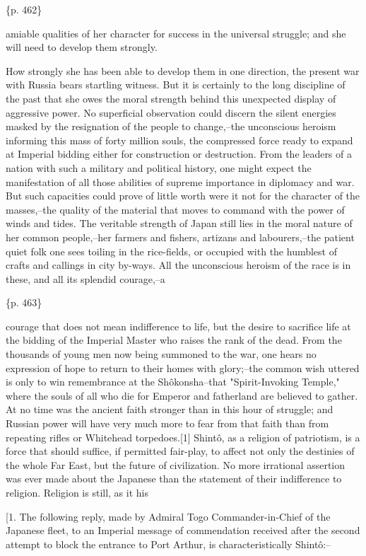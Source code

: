 \{p. 462\}

amiable qualities of her character for success in the universal struggle; and she will need to develop them strongly.


How strongly she has been able to develop them in one direction, the present war with Russia bears startling witness. But it is certainly to the long discipline of the past that she owes the moral strength behind this unexpected display of aggressive power. No superficial observation could discern the silent energies masked by the resignation of the people to change,--the unconscious heroism informing this mass of forty million souls, the compressed force ready to expand at Imperial bidding either for construction or destruction. From the leaders of a nation with such a military and political history, one might expect the manifestation of all those abilities of supreme importance in diplomacy and war. But such capacities could prove of little worth were it not for the character of the masses,--the quality of the material that moves to command with the power of winds and tides. The veritable strength of Japan still lies in the moral nature of her common people,--her farmers and fishers, artizans and labourers,--the patient quiet folk one sees toiling in the rice-fields, or occupied with the humblest of crafts and callings in city by-ways. All the unconscious heroism of the race is in these, and all its splendid courage,--a

\{p. 463\}

courage that does not mean indifference to life, but the desire to sacrifice life at the bidding of the Imperial Master who raises the rank of the dead. From the thousands of young men now being summoned to the war, one hears no expression of hope to return to their homes with glory;--the common wish uttered is only to win remembrance at the Shôkonsha--that "Spirit-Invoking Temple," where the souls of all who die for Emperor and fatherland are believed to gather. At no time was the ancient faith stronger than in this hour of struggle; and Russian power will have very much more to fear from that faith than from repeating rifles or Whitehead torpedoes.[1] Shintô, as a religion of patriotism, is a force that should suffice, if permitted fair-play, to affect not only the destinies of the whole Far East, but the future of civilization. No more irrational assertion was ever made about the Japanese than the statement of their indifference to religion. Religion is still, as it his

[1. The following reply, made by Admiral Togo Commander-in-Chief of the Japanese fleet, to an Imperial message of commendation received after the second attempt to block the entrance to Port Arthur, is characteristically Shintô:--

